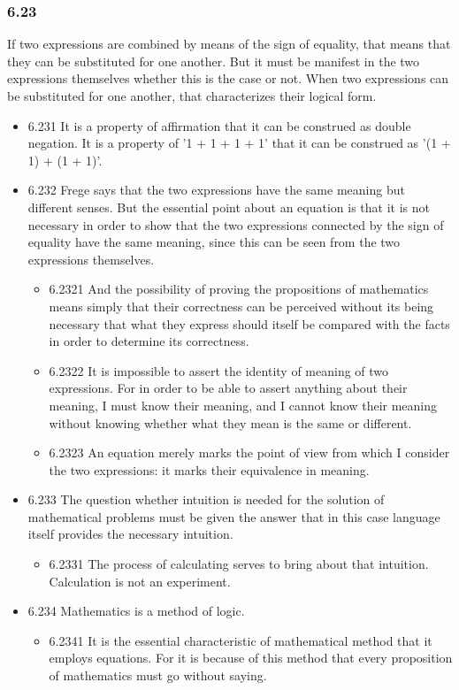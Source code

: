 \documentclass[11pt]{article}
\begin{document}
\subsubsection*{6.23}
\label{sec:org79da6d4}
If two expressions are combined by means of the sign of equality, that
means that they can be substituted for one another. But it must be manifest
in the two expressions themselves whether this is the case or not. When two
expressions can be substituted for one another, that characterizes their
logical form.
\begin{itemize}
\item 6.231
\label{sec:orgc991bdf}
It is a property of affirmation that it can be construed as double
negation. It is a property of '1 + 1 + 1 + 1' that it can be construed as
'(1 + 1) + (1 + 1)'.
\item 6.232
\label{sec:org59e9040}
Frege says that the two expressions have the same meaning but
different senses. But the essential point about an equation is that it is
not necessary in order to show that the two expressions connected by the
sign of equality have the same meaning, since this can be seen from the two
expressions themselves.
\begin{itemize}
\item 6.2321
\label{sec:org405dcac}
And the possibility of proving the propositions of mathematics means
simply that their correctness can be perceived without its being necessary
that what they express should itself be compared with the facts in order to
determine its correctness.
\item 6.2322
\label{sec:org209a29b}
It is impossible to assert the identity of meaning of two
expressions. For in order to be able to assert anything about their
meaning, I must know their meaning, and I cannot know their meaning without
knowing whether what they mean is the same or different.
\item 6.2323
\label{sec:orgea14df4}
An equation merely marks the point of view from which I consider the
two expressions: it marks their equivalence in meaning.
\end{itemize}
\item 6.233
\label{sec:org7c14b62}
The question whether intuition is needed for the solution of
mathematical problems must be given the answer that in this case language
itself provides the necessary intuition.
\begin{itemize}
\item 6.2331
\label{sec:org0ff268d}
The process of calculating serves to bring about that intuition.
Calculation is not an experiment.
\end{itemize}
\item 6.234
\label{sec:org42462ec}
Mathematics is a method of logic.
\begin{itemize}
\item 6.2341
\label{sec:orgf86adc7}
It is the essential characteristic of mathematical method that it
employs equations. For it is because of this method that every proposition
of mathematics must go without saying.
\end{itemize}
\end{itemize}
\end{document}
